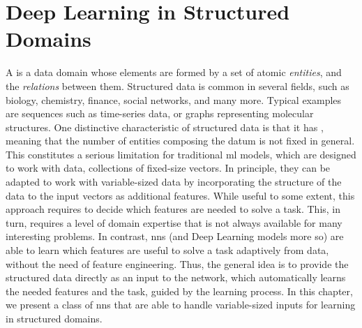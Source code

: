 \chapter{Deep Learning in Structured Domains} \label{ch:deep-learning-structures}
A  is a data domain whose elements are formed by a set of atomic \emph{entities}, and the \emph{relations} between them. Structured data is common in several fields, such as biology, chemistry, finance, social networks, and many more. Typical examples are sequences such as time-series data, or graphs representing molecular structures. One distinctive characteristic of structured data is that it has , meaning that the number of entities composing the datum is not fixed in general. This constitutes a serious limitation for traditional \gls{ml} models, which are designed to work with  data, \ie collections of fixed-size vectors. In principle, they can be adapted to work with variable-sized data by incorporating the structure of the data to the input vectors as additional features. While useful to some extent, this approach requires to decide \apriori which features are needed to solve a task. This, in turn, requires a level of domain expertise that is not always available for many interesting problems. In contrast, \glspl{nn} (and Deep Learning models more so) are able to learn which features are useful to solve a task adaptively from data, without the need of feature engineering. Thus, the general idea is to provide the structured data directly as an input to the network, which automatically learns the needed features and the task, guided by the learning process. In this chapter, we present a class of \glspl{nn} that are able to handle variable-sized inputs for learning in structured domains.


